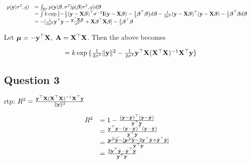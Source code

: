 \documentclass{amsart}[12pt]
\begin{document}
\begin{equation*}
	\begin{array}{ll}
		p({\bf y} | \sigma^2, g) & = \int_{{\mathbb R}^p} p({\bf y} | {\boldsymbol \beta}, \sigma^2) p({\boldsymbol \beta} | \sigma^2, g) d {\boldsymbol \beta}                                                                                                                                                       \\
		                     & = \int k \exp{\{ - \tfrac{1}{2} ({\bf y}- {\bf X}{\boldsymbol\beta})^\top \sigma^{-2} {\bf I}({\bf y}- {\bf X}{\boldsymbol\beta}) -  \tfrac{1}{2} {\boldsymbol\beta}^\top {\boldsymbol\beta}\}} d {\boldsymbol \beta} - \frac{1}{2 \sigma^2} ({\bf y} - {\bf X} {\boldsymbol \beta})^\top ({\bf y} - {\bf X} {\boldsymbol \beta}) -\tfrac{1}{2} {\boldsymbol \beta}^\top {\boldsymbol\beta} d {\boldsymbol \beta} \\
		                     & = -[\frac{1}{2 \sigma^2} {\bf y}^\top {\bf y} - \frac{{\bf y}^\top {\bf X} {\boldsymbol\beta}}{\sigma^2} + {\bf X} {\boldsymbol \beta}^\top {\bf X} {\boldsymbol\beta}] - \tfrac{1}{2} {\boldsymbol \beta}^\top {\boldsymbol\beta}                                                                                           
	\end{array}
\end{equation*}

Let ${\boldsymbol \mu} = -{\bf y}^\top {\bf X}$, ${\bf A} = {\bf X}^\top {\bf X}$. Then the above becomes

\begin{equation*}
	\begin{array}{ll}
		  & = k \exp{ \{ \frac{1}{2 \sigma^2} \| {\bf y}\|^2 - \frac{1}{2 \sigma^2} {\bf y}^\top {\bf X}({\bf X}^\top {\bf X})^{-1} {\bf X}^\top {\bf y}\} } 
	\end{array}
\end{equation*}

\subsection{Question 3}

rtp: $R^2 = \frac{{\bf y}^\top {\bf X} ({\bf X}^\top {\bf X})^{-1} {\bf X}^\top {\bf y}}{\| {\bf y} \|^2}$

\begin{equation*}
	\begin{array}{ll}
		R^2 & = 1 - \frac{({\bf y} - \hat{{\bf y}})^\top ({\bf y} - \hat{{\bf y}})}{{\bf y}^\top {\bf y}}                                                      \\
		    & = \frac{{\bf y}^\top {\bf y} - ({\bf y} - \hat{{\bf y}})^\top ({\bf y} - \hat{{\bf y}})}{{\bf y}^\top {\bf y}}                                           \\
		    & = \frac{\cancel{{\bf y}^\top {\bf y}} - [\cancel{{\bf y}^\top {\bf y}} - 2 {\bf y}^\top \hat{{\bf y}} + \hat{{\bf y}}^\top \hat{{\bf y}}]}{{\bf y}^\top {\bf y}} \\
		    & = \frac{2 {\bf y}^\top \hat{{\bf y}} - \hat{{\bf y}}^\top \hat{{\bf y}}}{{\bf y}^\top {\bf y}}                                                   
	\end{array}
\end{equation*}
\end{document}
